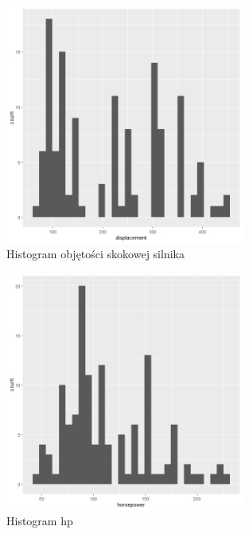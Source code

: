 \documentclass{article}
\begin{document}
            \begin{figure}[H]
                \caption{Histogram objętości skokowej silnika}
                \centering
                \includegraphics[width=0.7\textwidth]{../histograms/displacement_hist.jpeg}
            \end{figure}
            \begin{figure}[H]
                \caption{Histogram hp}
                \centering
                \includegraphics[width=0.7\textwidth]{../histograms/horsepower_hist.jpeg}
            \end{figure}
\end{document}
